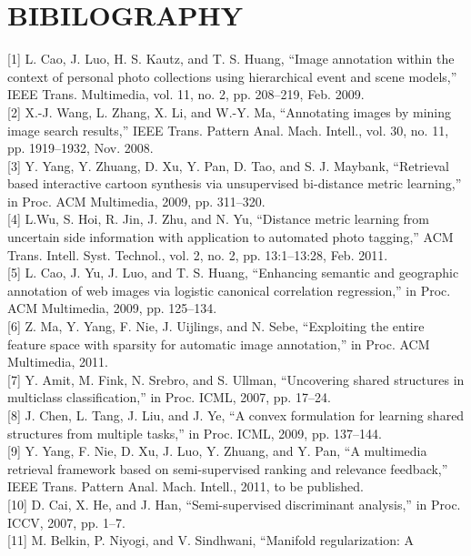 \documentclass[a4paper,11pt]{report}
\begin{document}
\chapter*{BIBILOGRAPHY}
[1] L. Cao, J. Luo, H. S. Kautz, and T. S. Huang, “Image annotation within
the context of personal photo collections using hierarchical event and
scene models,” IEEE Trans. Multimedia, vol. 11, no. 2, pp. 208–219,
Feb. 2009.\\[0.5cm]
[2] X.-J. Wang, L. Zhang, X. Li, and W.-Y. Ma, “Annotating images by
mining image search results,” IEEE Trans. Pattern Anal. Mach. Intell.,
vol. 30, no. 11, pp. 1919–1932, Nov. 2008.\\[0.5cm]
[3] Y. Yang, Y. Zhuang, D. Xu, Y. Pan, D. Tao, and S. J. Maybank, “Retrieval
based interactive cartoon synthesis via unsupervised bi-distance
metric learning,” in Proc. ACM Multimedia, 2009, pp. 311–320. \\[0.5cm]
[4] L.Wu, S. Hoi, R. Jin, J. Zhu, and N. Yu, “Distance metric learning from
uncertain side information with application to automated photo tagging,”
ACM Trans. Intell. Syst. Technol., vol. 2, no. 2, pp. 13:1–13:28,
Feb. 2011.\\[0.5cm]
[5] L. Cao, J. Yu, J. Luo, and T. S. Huang, “Enhancing semantic and geographic
annotation of web images via logistic canonical correlation
regression,” in Proc. ACM Multimedia, 2009, pp. 125–134.\\[0.5cm]
[6] Z. Ma, Y. Yang, F. Nie, J. Uijlings, and N. Sebe, “Exploiting the entire
feature space with sparsity for automatic image annotation,” in Proc.
ACM Multimedia, 2011.\\[0.5cm]
[7] Y. Amit, M. Fink, N. Srebro, and S. Ullman, “Uncovering shared structures
in multiclass classification,” in Proc. ICML, 2007, pp. 17–24.\\[0.5cm]
[8] J. Chen, L. Tang, J. Liu, and J. Ye, “A convex formulation for learning
shared structures from multiple tasks,” in Proc. ICML, 2009, pp.
137–144.\\[0.5cm]
[9] Y. Yang, F. Nie, D. Xu, J. Luo, Y. Zhuang, and Y. Pan, “A multimedia
retrieval framework based on semi-supervised ranking and relevance
feedback,” IEEE Trans. Pattern Anal. Mach. Intell., 2011, to be published.\\[0.5cm]
[10] D. Cai, X. He, and J. Han, “Semi-supervised discriminant analysis,” in
Proc. ICCV, 2007, pp. 1–7.\\[0.5cm]
[11] M. Belkin, P. Niyogi, and V. Sindhwani, “Manifold regularization: A
\end{document}

